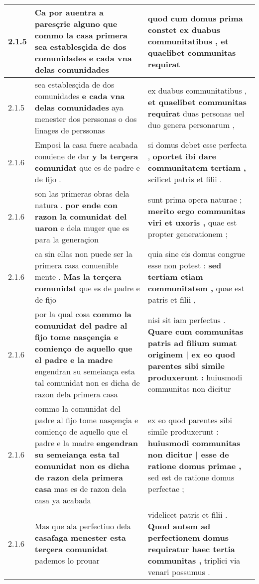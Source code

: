 \begin{tabular}{|p{1cm}|p{6.5cm}|p{6.5cm}|}
2.1.5 & Ca por auentra a paresçrie alguno que commo la casa primera \textbf{ sea establesçida de dos comunidades } e cada vna delas comunidades & quod cum domus prima constet \textbf{ ex duabus communitatibus , } et quaelibet communitas requirat \\\hline
2.1.5 & sea establesçida de dos comunidades \textbf{ e cada vna delas comunidades } aya menester dos perssonas o dos linages de perssonas & ex duabus communitatibus , \textbf{ et quaelibet communitas requirat } duas personas uel duo genera personarum , \\\hline
2.1.6 & Emposi la casa fuere acabada conuiene de dar \textbf{ y la terçera comunidat } que es de padre e de fijo . & si domus debet esse perfecta , \textbf{ oportet ibi dare communitatem tertiam , } scilicet patris et filii . \\\hline
2.1.6 & son las primeras obras dela natura . \textbf{ por ende con razon la comunidat del uaron } e dela muger que es para la generaçion & sunt prima opera naturae ; \textbf{ merito ergo communitas viri et uxoris , } quae est propter generationem ; \\\hline
2.1.6 & ca sin ellas non puede ser la primera casa conuenible mente . \textbf{ Mas la terçera comunidat } que es de padre e de fijo & quia sine eis domus congrue esse non potest : \textbf{ sed tertiam etiam communitatem , } quae est patris et filii , \\\hline
2.1.6 & por la qual cosa \textbf{ commo la comunidat del padre al fijo tome nasçençia e comienço de aquello que el padre e la madre } engendran su semeiança esta tal comunidat non es dicha de razon dela primera casa & nisi sit iam perfectus . \textbf{ Quare cum communitas patris ad filium sumat originem | ex eo quod parentes sibi simile produxerunt : } huiusmodi communitas non dicitur \\\hline
2.1.6 & commo la comunidat del padre al fijo tome nasçençia e comienço de aquello que el padre e la madre \textbf{ engendran su semeiança esta tal comunidat non es dicha de razon dela primera casa } mas es de razon dela casa ya acabada & ex eo quod parentes sibi simile produxerunt : \textbf{ huiusmodi communitas non dicitur | esse de ratione domus primae , } sed est de ratione domus perfectae ; \\\hline
2.1.6 & Mas que ala perfectiuo dela \textbf{ casafaga menester esta terçera comunidat } pademos lo prouar & videlicet patris et filii . \textbf{ Quod autem ad perfectionem domus requiratur haec tertia communitas , } triplici via venari possumus . \\\hline

\end{tabular}
